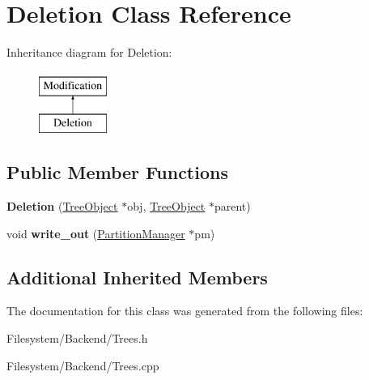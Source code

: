 \hypertarget{classDeletion}{}\section{Deletion Class Reference}
\label{classDeletion}
Inheritance diagram for Deletion\+:\begin{figure}[H]
\begin{center}
\leavevmode
\includegraphics[height=2.000000cm]{classDeletion}
\end{center}
\end{figure}
\subsection*{Public Member Functions}
\begin{DoxyCompactItemize}
\item 
\mbox{\label{classDeletion_a8446318e3f7004ef557b6021350fa389}} 
{\bfseries Deletion} (\mbox{\hyperlink{classTreeObject}{Tree\+Object}} $\ast$obj, \mbox{\hyperlink{classTreeObject}{Tree\+Object}} $\ast$parent)
\item 
\mbox{\label{classDeletion_ac5bdb21c4a8dbc8afea9910435e509a8}} 
void {\bfseries write\+\_\+out} (\mbox{\hyperlink{classPartitionManager}{Partition\+Manager}} $\ast$pm)
\end{DoxyCompactItemize}
\subsection*{Additional Inherited Members}


The documentation for this class was generated from the following files\+:\begin{DoxyCompactItemize}
\item 
Filesystem/\+Backend/Trees.\+h\item 
Filesystem/\+Backend/Trees.\+cpp\end{DoxyCompactItemize}
